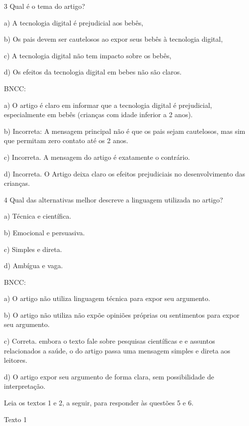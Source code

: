 {\num{3} Qual é o tema do artigo?

a) A tecnologia digital é prejudicial aos bebês,

b) Os pais devem ser cautelosos ao expor seus bebês à tecnologia
digital,

c) A tecnologia digital não tem impacto sobre os bebês,

d) Os efeitos da tecnologia digital em bebes não são claros.

BNCC:

a) O artigo é claro em informar que a tecnologia digital é prejudicial,
especialmente em bebês (crianças com idade inferior a 2 anos).

b) Incorreta: A mensagem principal não é que os pais sejam cautelosos,
mas sim que permitam zero contato até os 2 anos.

c) Incorreta. A mensagem do artigo é exatamente o contrário.

d) Incorreta. O Artigo deixa claro os efeitos prejudiciais no
desenvolvimento das crianças.

\num{4} Qual das alternativas melhor descreve a linguagem utilizada no
artigo?

a) Técnica e científica.

b) Emocional e persuasiva.

c) Simples e direta.

d) Ambígua e vaga.

BNCC:

a) O artigo não utiliza linguagem técnica para expor seu argumento.

b) O artigo não utiliza não expõe opiniões próprias ou sentimentos para
expor seu argumento.

c) Correta. embora o texto fale sobre pesquisas científicas e e assuntos
relacionados a saúde, o do artigo passa uma mensagem simples e direta
aos leitores.

d) O artigo expor seu argumento de forma clara, sem possibilidade de
interpretação.

Leia os textos 1 e 2, a seguir, para responder às questões 5 e 6.

Texto 1

}
